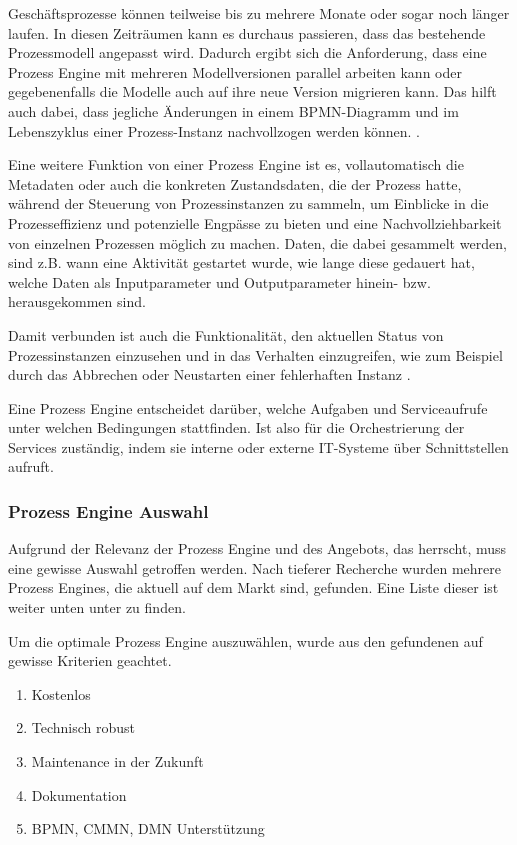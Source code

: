 Geschäftsprozesse können teilweise bis zu mehrere Monate oder sogar noch länger laufen. In diesen Zeiträumen kann es durchaus passieren, dass das bestehende Prozessmodell angepasst wird. Dadurch ergibt sich die Anforderung, dass eine Prozess Engine mit mehreren Modellversionen parallel arbeiten kann oder gegebenenfalls die Modelle auch auf ihre neue Version migrieren kann. Das hilft auch dabei, dass jegliche Änderungen in einem \ac{BPMN}-Diagramm und im Lebenszyklus einer Prozess-Instanz nachvollzogen werden können. \citep[vgl.][S. 226]{freund_praxishandbuch_2017}.

Eine weitere Funktion von einer Prozess Engine ist es, vollautomatisch die Metadaten oder auch die konkreten Zustandsdaten, die der Prozess hatte, während der Steuerung von Prozessinstanzen zu sammeln, um Einblicke in die Prozesseffizienz und potenzielle Engpässe zu bieten und eine Nachvollziehbarkeit von einzelnen Prozessen möglich zu machen. Daten, die dabei gesammelt werden, sind z.B. wann eine Aktivität gestartet wurde, wie lange diese gedauert hat, welche Daten als Inputparameter und Outputparameter hinein- bzw. herausgekommen sind. \citep[vgl.][S. 7, 226]{freund_praxishandbuch_2017} \citep[vgl.][]{stiehl_prozessgesteuerte_2024} 

Damit verbunden ist auch die Funktionalität, den aktuellen Status von Prozessinstanzen einzusehen und in das Verhalten einzugreifen, wie zum Beispiel durch das Abbrechen oder Neustarten einer fehlerhaften Instanz \citep[vgl.][S.226]{freund_praxishandbuch_2017}.

Eine Prozess Engine entscheidet darüber, welche Aufgaben und Serviceaufrufe unter welchen Bedingungen stattfinden. Ist also für die Orchestrierung der Services zuständig, indem sie interne oder externe IT-Systeme über Schnittstellen aufruft. \citep[vgl.][S. 6]{freund_praxishandbuch_2017}

\subsubsection{Prozess Engine Auswahl}
\label{sec:process_engine_auswahl}

Aufgrund der Relevanz der Prozess Engine und des Angebots, das herrscht, muss eine gewisse Auswahl getroffen werden. Nach tieferer Recherche wurden mehrere Prozess Engines, die aktuell auf dem Markt sind, gefunden. Eine Liste dieser ist weiter unten unter  zu finden. 

Um die optimale Prozess Engine auszuwählen, wurde aus den gefundenen auf gewisse Kriterien geachtet. 
\begin{enumerate}
    \item Kostenlos
    \item Technisch robust
    \item Maintenance in der Zukunft
    \item Dokumentation
    \item \acs{BPMN}, \acs{CMMN}, \acs{DMN} Unterstützung
\end{enumerate}

